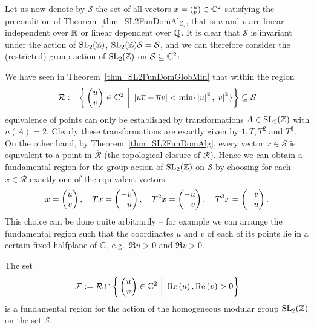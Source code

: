 Let us now denote by $\mathcal{S}$ the set of all vectors $x = ({}^u_v) \in \mathbb{C}^2$ satisfying the precondition of Theorem~\ref{thm_SL2FunDomAlg}, that is $u$ and $v$ are linear independent over $\mathbb{R}$ or linear dependent over $\mathbb{Q}$. It is clear that $\mathcal{S}$ is invariant under the action of $\operatorname{SL}_{2}(\mathbb{Z})$, \ie $\operatorname{SL}_{2}(\mathbb{Z})\mathcal{S} = \mathcal{S}$, and we can therefore consider the (restricted) group action of $\operatorname{SL}_{2}(\mathbb{Z})$ on $\mathcal{S} \subseteq \mathbb{C}^2$:

We have seen in Theorem~\ref{thm_SL2FunDomGlobMin} that within the region
\begin{equation}
\mathcal{R} := \bigg\{ \begin{pmatrix}u \\ v\end{pmatrix} \in \mathbb{C}^2 \ \bigg| \ \left|u\overline{v} + \overline{u}v\right| < \min \{\left|u\right|^2, \left|v\right|^2\} \bigg\} \subseteq \mathcal{S}
\end{equation}
equivalence of points can only be established by transformations $A \in \operatorname{SL}_{2}(\mathbb{Z})$ with $n(A) = 2$. Clearly these transformations are exactly given by $1, T, T^2$ and $T^3$. On the other hand, by Theorem~\ref{thm_SL2FunDomAlg}, every vector $x \in \mathcal{S}$ is equivalent to a point in $\overline{\mathcal{R}}$ (the topological closure of $\mathcal{R}$). Hence we can obtain a fundamental region for the group action of $\operatorname{SL}_{2}(\mathbb{Z})$ on $\mathcal{S}$ by choosing for each $x \in \mathcal{R}$ exactly one of the equivalent vectors 
\begin{equation*}
x = \begin{pmatrix}u \\ v\end{pmatrix},\quad 
Tx = \begin{pmatrix}-v \\ \phantom{+}u\end{pmatrix},\quad
T^2x = \begin{pmatrix}-u \\ -v\end{pmatrix},\quad
T^3x = \begin{pmatrix}\phantom{+}v \\ -u\end{pmatrix}.
\end{equation*}
This choice can be done quite arbitrarily -- for example we can arrange the fundamental region such that the coordinates $u$ and $v$ of each of its points lie in a certain fixed halfplane of $\mathbb{C}$, e.g.\ $\Re{u} > 0$ and $\Re{v} > 0$.
\begin{corollary}
\label{cor_SL2FunDom}
The set
\begin{equation}
\mathcal{F} := \mathcal{R} \cap \bigg\{ \begin{pmatrix}u \\ v\end{pmatrix} \in \mathbb{C}^2 \ \bigg| \ \operatorname{Re}\left(u\right), \operatorname{Re}\left(v\right) > 0 \bigg\}
\end{equation}
is a fundamental region for the action of the homogeneous modular group $\operatorname{SL}_{2}(\mathbb{Z})$ on the set $\mathcal{S}$.
\end{corollary}
